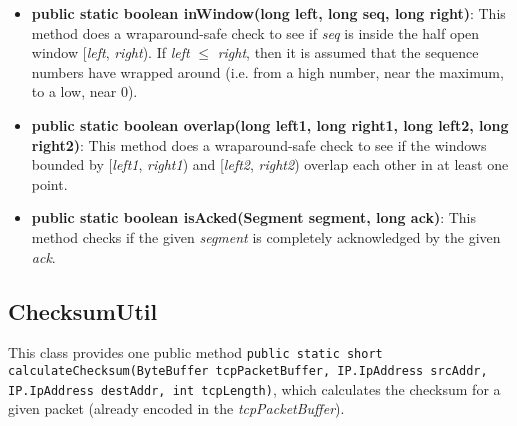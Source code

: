 \documentclass{hitec}
\newcommand{\methodname}[1]{\texttt{#1}}
\begin{document}
\begin{itemize}
 \item \textbf{public static boolean inWindow(long left, long seq, long right)}: This method does a wraparound-safe check to see if \emph{seq} is inside the half open window [\emph{left}, \emph{right}). If \emph{left} $\leq$ \emph{right}, then it is assumed that the sequence numbers have wrapped around (i.e. from a high number, near the maximum, to a low, near 0). 
 
 \item \textbf{public static boolean overlap(long left1, long right1, long left2, long right2)}: This method does a wraparound-safe check to see if the windows bounded by [\emph{left1}, \emph{right1}) and [\emph{left2}, \emph{right2}) overlap each other in at least one point.
 
 \item \textbf{public static boolean isAcked(Segment segment, long ack)}: This method checks if the given \emph{segment} is completely acknowledged by the given \emph{ack}.
\end{itemize}


\subsection{ChecksumUtil}
This class provides one public method \methodname{public static short calculateChecksum(ByteBuffer tcpPacketBuffer, IP.IpAddress srcAddr, IP.IpAddress destAddr, int tcpLength)}, which calculates the checksum for a given packet (already encoded in the \emph{tcpPacketBuffer}). 
\end{document}
